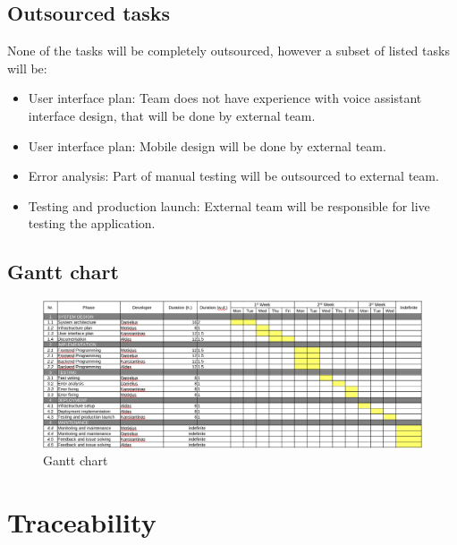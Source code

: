 \documentclass[
    english, %
]{VUMIFPSkursinis}
\begin{document}
\subsection{Outsourced tasks}

None of the tasks will be completely outsourced, however a subset of listed tasks will be:

\begin{itemize}
    \item User interface plan: Team does not have experience with voice assistant interface design, that will be done by external team.
    \item User interface plan: Mobile design will be done by external team.
    \item Error analysis: Part of manual testing will be outsourced to external team.
    \item Testing and production launch: External team will be responsible for live testing the application.
\end{itemize}

\subsection{Gantt chart}

\begin{figure}[ht]
    \centering
    \includegraphics[width=\textwidth]{../lab3diags/Gantt_image.png}
    \caption{Gantt chart}
    \label{gantt-table}
\end{figure}

\section{Traceability}
\end{document}
